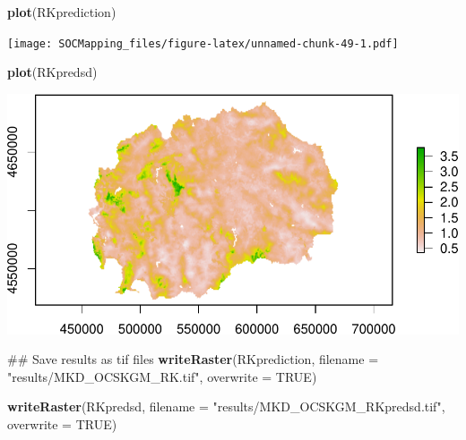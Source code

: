 \documentclass[10pt,b5paper,]{book}
\newenvironment{Shaded}{\begin{snugshade}}{\end{snugshade}}
\newcommand{\DataTypeTok}[1]{\textcolor[rgb]{0.13,0.29,0.53}{#1}}
\newcommand{\DecValTok}[1]{\textcolor[rgb]{0.00,0.00,0.81}{#1}}
\newcommand{\KeywordTok}[1]{\textcolor[rgb]{0.13,0.29,0.53}{\textbf{#1}}}
\newcommand{\NormalTok}[1]{#1}
\newcommand{\OperatorTok}[1]{\textcolor[rgb]{0.81,0.36,0.00}{\textbf{#1}}}
\newcommand{\OtherTok}[1]{\textcolor[rgb]{0.56,0.35,0.01}{#1}}
\newcommand{\StringTok}[1]{\textcolor[rgb]{0.31,0.60,0.02}{#1}}
\theoremstyle{definition}
\theoremstyle{definition}
\theoremstyle{definition}
\theoremstyle{remark}
\begin{document}
\begin{Shaded}
\end{Shaded}

\begin{Shaded}
\begin{Highlighting}[]
\KeywordTok{plot}\NormalTok{(RKprediction)}
\end{Highlighting}
\end{Shaded}

\texttt{[image: SOCMapping\_files/figure-latex/unnamed-chunk-49-1.pdf]}

\begin{Shaded}
\begin{Highlighting}[]
\KeywordTok{plot}\NormalTok{(RKpredsd)}
\end{Highlighting}
\end{Shaded}

\includegraphics{SOCMapping_files/figure-latex/unnamed-chunk-50-1.pdf}

\begin{Shaded}
\begin{Highlighting}[]
\NormalTok{## Save results as tif files}
\KeywordTok{writeRaster}\NormalTok{(RKprediction, }\DataTypeTok{filename =} \StringTok{"results/MKD_OCSKGM_RK.tif"}\NormalTok{,}
            \DataTypeTok{overwrite =} \OtherTok{TRUE}\NormalTok{)}

\KeywordTok{writeRaster}\NormalTok{(RKpredsd, }\DataTypeTok{filename =} \StringTok{"results/MKD_OCSKGM_RKpredsd.tif"}\NormalTok{,}
            \DataTypeTok{overwrite =} \OtherTok{TRUE}\NormalTok{)}
\end{Highlighting}
\end{Shaded}
\end{document}
